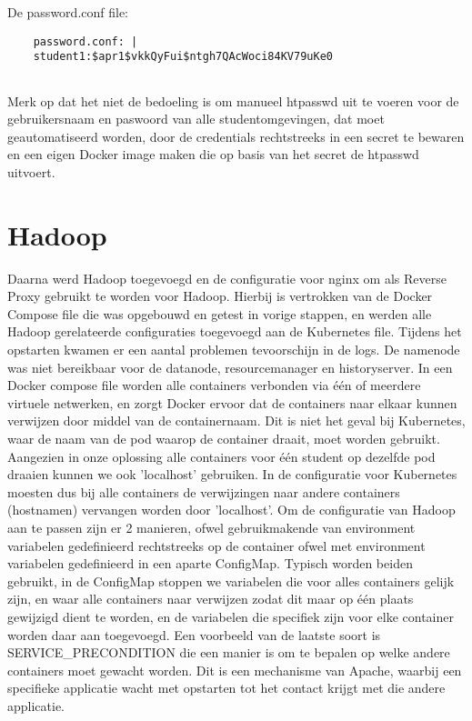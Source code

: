 De password.conf file:
\begin{lstlisting}
    password.conf: |
    student1:$apr1$vkkQyFui$ntgh7QAcWoci84KV79uKe0
    
\end{lstlisting}


Merk op dat het niet de bedoeling is om manueel htpasswd uit te voeren voor de gebruikersnaam en paswoord van alle studentomgevingen, dat moet geautomatiseerd worden, door de credentials rechtstreeks in een secret te bewaren en een eigen Docker image maken die op basis van het secret de htpasswd uitvoert.

\section{Hadoop}
Daarna werd Hadoop toegevoegd en de configuratie voor nginx om als Reverse Proxy gebruikt te worden voor Hadoop. Hierbij is vertrokken van de Docker Compose file die was opgebouwd en getest in vorige stappen, en werden alle Hadoop gerelateerde configuraties toegevoegd aan de Kubernetes file. Tijdens het opstarten kwamen er een aantal problemen tevoorschijn in de logs. De namenode was niet bereikbaar voor de datanode, resourcemanager en historyserver.
In een Docker compose file worden alle containers verbonden via \'e\'en of meerdere virtuele netwerken, en zorgt Docker ervoor dat de containers naar elkaar kunnen verwijzen door middel van de containernaam. Dit is niet het geval bij Kubernetes, waar de naam van de pod waarop de container draait, moet worden gebruikt. Aangezien in onze oplossing alle containers voor \'e\'en student op dezelfde pod draaien kunnen we ook 'localhost' gebruiken.\newline
In de configuratie voor Kubernetes moesten dus bij alle containers de verwijzingen naar andere containers (hostnamen) vervangen worden door 'localhost'.
\newline
\newline
Om de configuratie van Hadoop aan te passen zijn er 2 manieren, ofwel gebruikmakende van environment variabelen gedefinieerd rechtstreeks op de container ofwel met environment variabelen gedefinieerd in een aparte ConfigMap. Typisch worden beiden gebruikt, in de ConfigMap stoppen we variabelen die voor alles containers gelijk zijn, en waar alle containers naar verwijzen zodat dit maar op \'e\'en plaats gewijzigd dient te worden, en de variabelen die specifiek zijn voor elke container worden daar aan toegevoegd. Een voorbeeld van de laatste soort is SERVICE\_PRECONDITION die een manier is om te bepalen op welke andere containers moet gewacht worden. Dit is een mechanisme van Apache, waarbij een specifieke applicatie wacht met opstarten tot het contact krijgt met die andere applicatie.
